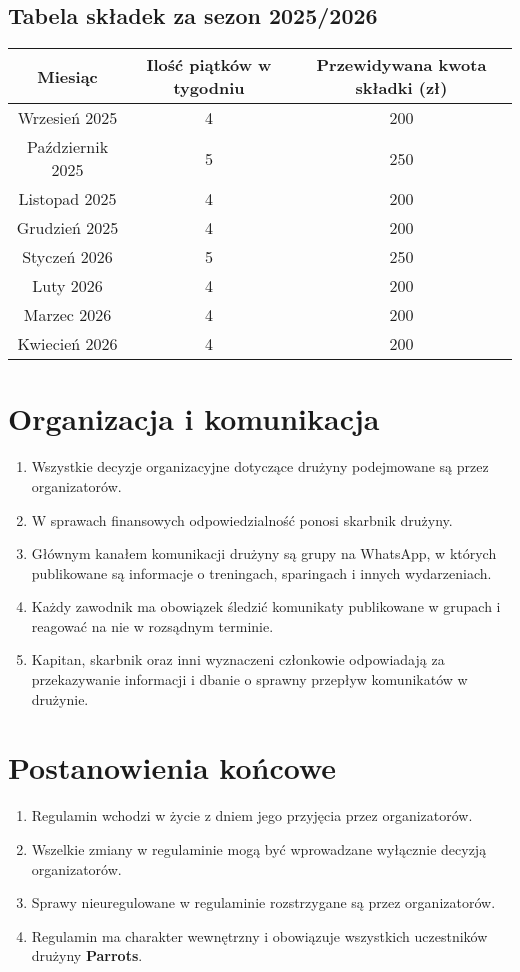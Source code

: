 \documentclass[12pt,a4paper]{article}
\let\stdsection\section
\renewcommand\section{\clearpage\stdsection}
\begin{document}
\subsection{Tabela składek za sezon 2025/2026}
\begin{center}
\begin{tabular}{ |c|c|c| } 
 \hline
 Miesiąc & Ilość piątków w tygodniu & Przewidywana kwota składki (zł) \\ 
 \hline
 Wrzesień 2025 & 4 & 200 \\ 
 Październik 2025 & 5 & 250 \\ 
 Listopad 2025 & 4 & 200 \\ 
 Grudzień 2025 & 4 & 200 \\ 
 Styczeń 2026 & 5 & 250 \\ 
 Luty 2026 & 4 & 200 \\ 
 Marzec 2026 & 4 & 200 \\ 
 Kwiecień 2026 & 4 & 200 \\ 
\hline
\end{tabular}
\end{center}

\section{Organizacja i komunikacja}
\begin{enumerate}
  \item Wszystkie decyzje organizacyjne dotyczące drużyny podejmowane są przez organizatorów.
  \item W sprawach finansowych odpowiedzialność ponosi skarbnik drużyny.
  \item Głównym kanałem komunikacji drużyny są grupy na WhatsApp, w których publikowane są informacje o treningach, sparingach i innych wydarzeniach.
  \item Każdy zawodnik ma obowiązek śledzić komunikaty publikowane w grupach i reagować na nie w rozsądnym terminie.
  \item Kapitan, skarbnik oraz inni wyznaczeni członkowie odpowiadają za przekazywanie informacji i dbanie o sprawny przepływ komunikatów w drużynie.
\end{enumerate}

\section{Postanowienia końcowe}
\begin{enumerate}
  \item Regulamin wchodzi w życie z dniem jego przyjęcia przez organizatorów.
  \item Wszelkie zmiany w regulaminie mogą być wprowadzane wyłącznie decyzją organizatorów.
  \item Sprawy nieuregulowane w regulaminie rozstrzygane są przez organizatorów.
  \item Regulamin ma charakter wewnętrzny i obowiązuje wszystkich uczestników drużyny \textbf{Parrots}.
\end{enumerate}
\end{document}
